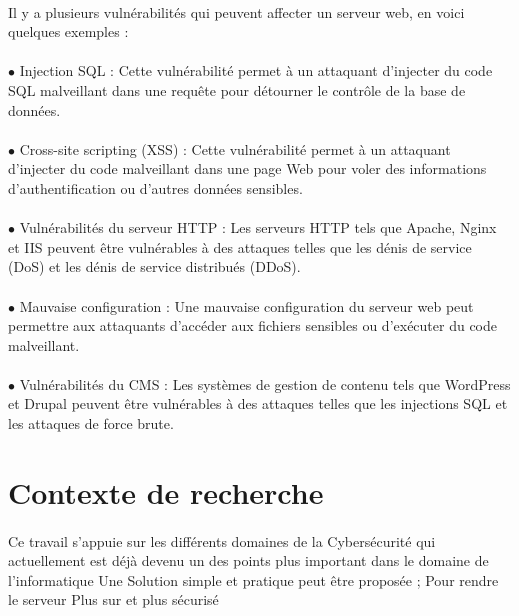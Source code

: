 \documentclass{report}
\begin{document}
  \paragraph{ }
  Il y a plusieurs vulnérabilités qui peuvent affecter un serveur web, en voici quelques exemples :
  \paragraph{ }
  $\bullet$ Injection SQL : Cette vulnérabilité permet à un attaquant d'injecter du code SQL malveillant dans une requête pour détourner le contrôle de la base de données.
  \paragraph{ }
  $\bullet$ Cross-site scripting (XSS) : Cette vulnérabilité permet à un attaquant d'injecter du code malveillant dans une page Web pour voler des informations d'authentification ou d'autres données sensibles.
  \paragraph{ }
  $\bullet$ Vulnérabilités du serveur HTTP : Les serveurs HTTP tels que Apache, Nginx et IIS peuvent être vulnérables à des attaques telles que les dénis de service (DoS) et les dénis de service distribués (DDoS).
  \paragraph{ }
  $\bullet$ Mauvaise configuration : Une mauvaise configuration du serveur web peut permettre aux attaquants d'accéder aux fichiers sensibles ou d'exécuter du code malveillant.
  \paragraph{ }
  $\bullet$ Vulnérabilités du CMS : Les systèmes de gestion de contenu tels que WordPress et Drupal peuvent être vulnérables à des attaques telles que les injections SQL et les attaques de force brute.
  
  
   \section{Contexte de recherche }
   \paragraph{ } Ce travail s'appuie sur les différents domaines   de la  Cybersécurité qui actuellement est déjà devenu un  des points  plus   important dans le domaine de l'informatique 
   Une Solution simple et pratique peut être proposée  \space;
   Pour rendre le serveur Plus sur et plus sécurisé
\end{document}
